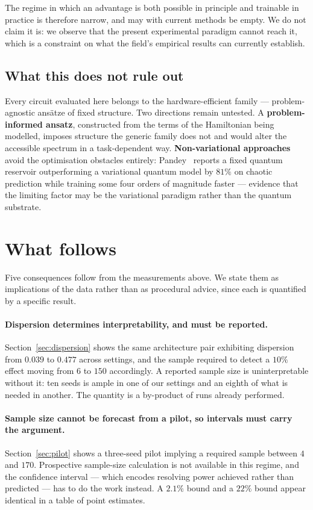 \documentclass[11pt,onecolumn]{article}
\begin{document}
The regime in which an advantage is both possible in principle and
trainable in practice is therefore narrow, and may with current methods
be empty. We do not claim it is: we observe that the present
experimental paradigm cannot reach it, which is a constraint on what the
field's empirical results can currently establish.

\subsection{What this does not rule out}
Every circuit evaluated here belongs to the hardware-efficient family
--- problem-agnostic ans\"atze of fixed structure. Two directions remain
untested. A \textbf{problem-informed ansatz}, constructed from the terms
of the Hamiltonian being modelled, imposes structure the generic family
does not and would alter the accessible spectrum in a task-dependent
way. \textbf{Non-variational approaches} avoid the optimisation
obstacles entirely: Pandey~\cite{pandey2026} reports a fixed quantum
reservoir outperforming a variational quantum model by $81\%$ on chaotic
prediction while training some four orders of magnitude faster ---
evidence that the limiting factor may be the variational paradigm rather
than the quantum substrate.

\section{What follows}\label{sec:follows}
Five consequences follow from the measurements above. We state them as
implications of the data rather than as procedural advice, since each is
quantified by a specific result.

\paragraph{Dispersion determines interpretability, and must be
reported.}
Section~\ref{sec:dispersion} shows the same architecture pair exhibiting
dispersion from $0.039$ to $0.477$ across settings, and the sample
required to detect a $10\%$ effect moving from $6$ to $150$ accordingly.
A reported sample size is uninterpretable without it: ten seeds is ample
in one of our settings and an eighth of what is needed in another. The
quantity is a by-product of runs already performed.

\paragraph{Sample size cannot be forecast from a pilot, so intervals
must carry the argument.}
Section~\ref{sec:pilot} shows a three-seed pilot implying a required
sample between $4$ and $170$. Prospective sample-size calculation is not
available in this regime, and the confidence interval --- which encodes
resolving power achieved rather than predicted --- has to do the work
instead. A $2.1\%$ bound and a $22\%$ bound appear identical in a table
of point estimates.
\end{document}
